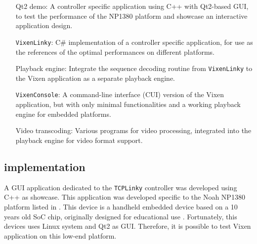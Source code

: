 \chapter{}
\renewcommand{\baselinestretch}{\mystretch}
\label{chap:Impl}

 

\begin{enumerate}[noitemsep,leftmargin=4cm]
  \item[Qt2 demo:] A controller specific application using C++ with Qt2-based GUI, to test the performance of the NP1380 platform and showcase an interactive application design.
  \item[\texttt{VixenLinky}:] C\# implementation of a controller specific application, for use as the references of the optimal performances on different platforms.
  \item[Playback engine:] Integrate the sequence decoding routine from \texttt{VixenLinky} to the Vixen application as a separate playback engine.
  \item[\texttt{VixenConsole}:] A command-line interface (CUI) version of the Vixen application, but with only minimal functionalities and a working playback engine for embedded platforms.
  \item[Video transcoding:] Various programs for video processing, integrated into the playback engine for video format support.
\end{enumerate}

\section{ implementation}

A GUI application dedicated to the \texttt{TCPLinky} controller was developed using C++ as  showcase. This application was developed specific to the Noah NP1380 platform listed in . This device is a handheld embedded device based on a 10 years old SoC chip, originally designed for educational use . Fortunately, this devices uses Linux system and Qt2 as GUI. Therefore, it is possible to test Vixen application on this low-end platform.

